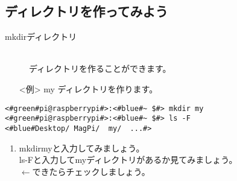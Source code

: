 \subsection{ディレクトリを作ってみよう}
\begin{description}
\item[mkdir\textvisiblespace ディレクトリ]\mbox{}\\
ディレクトリを作ることができます。
\end{description}
\begin{itemize}
\item[<例>]my ディレクトリを作ります。
\end{itemize}
\begin{lstlisting}[caption=mkdirの例, label=mkdir]
<#green#pi@raspberrypi#>:<#blue#~ $#> mkdir my
<#green#pi@raspberrypi#>:<#blue#~ $#> ls -F
<#blue#Desktop/	MagPi/	my/	 ...#>
\end{lstlisting}
\begin{tcolorbox}[title=\useOmetoi]
\begin{enumerate}
\item mkdir\textvisiblespace myと入力してみましょう。\\
ls\textvisiblespace -Fと入力してmyディレクトリがあるか見てみましょう。\\
\fbox{\phantom{白}} $\leftarrow$できたらチェックしましょう。
\end{enumerate}
\end{tcolorbox}